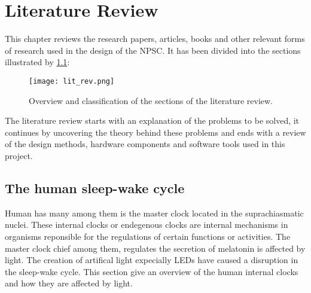 \chapter{Literature Review}

This chapter reviews the research papers, articles, books and other relevant forms of research used in the design of the NPSC. It has been divided into the sections illustrated by \cref{fig:lit_rev}:
\begin{figure}[h!]
\centering
\texttt{[image: lit\_rev.png]}
\caption{Overview and classification of the sections of the literature review.}
\label{fig:lit_rev}
\end{figure}
The literature review starts with an explanation of the problems to be solved, it continues by uncovering the theory behind these problems and ends with a review of the design methods, hardware components and software tools used in this project.

\section{The human sleep-wake cycle}

Human has many  among them is the master clock located in the suprachiasmatic nuclei. These internal clocks or endegenous clocks are internal mechanisms in organisms reponsible for the regulations of certain functions or activities. The master clock chief among them, regulates the secretion of melatonin is affected by light. The creation of artifical light expecially LEDs have caused a disruption in the sleep-wake cycle. This section give an overview of the human internal clocks and how they are affected by light.

